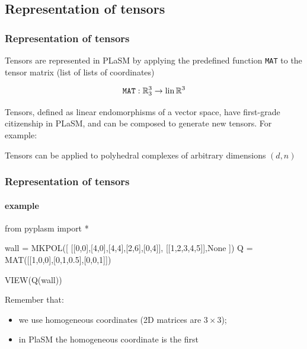 \documentclass{beamer}
\begin{document}
\subsection{Representation of tensors}

\begin{frame}[fragile]
\frametitle{Representation of tensors}

\vfill


Tensors are represented in PLaSM by applying the predefined function {\tt MAT}  to the tensor matrix (list of lists of coordinates)

\[
\mbox{\tt MAT} : \mathbb{R}^{3}_{3} \rightarrow \mbox{\rm lin}\, \mathbb{R}^{3}
\]

\vfill

Tensors, defined as linear endomorphisms of a vector space, have first-grade citizenship in PLaSM, and can be composed to generate new tensors. For example:

\vfill

Tensors can be applied to polyhedral complexes of arbitrary dimensions $(d,n)$

\end{frame}

\begin{frame}[fragile]
\frametitle{Representation of tensors}
\framesubtitle{example}

\begin{python}
from pyplasm import *

wall = MKPOL([  [[0,0],[4,0],[4,4],[2,6],[0,4]],
				[[1,2,3,4,5]],None  ])
Q = MAT([[1,0,0],[0,1,0.5],[0,0,1]])

VIEW(Q(wall))
\end{python}

\vfill 

Remember that: 

\begin{itemize}
\item
we use homogeneous coordinates (2D matrices are $3\times 3$);
\item
in PlaSM the homogeneous coordinate is the first
\end{itemize}

\end{frame}
\end{document}
